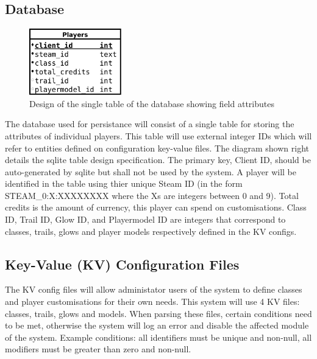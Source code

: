\documentclass[a4paper, 11pt]{article}
\begin{document}
\subsection{Database}
\begin{figure}
\center
\vspace{-20pt}
\includegraphics[width=4cm]{Design_Database.pdf}
\vspace{-10pt}
\caption{Design of the single table of the database showing field attributes}
\vspace{-10pt}
\end{figure}
The database used for persistance will consist of a single table for storing the attributes of individual players. This table will use external integer IDs which will refer to entities defined on configuration key-value files. The diagram shown right details the sqlite table design specification. The primary key, Client ID, should be auto-generated by sqlite but shall not be used by the system. A player will be identified in the table using thier unique Steam ID (in the form STEAM\_0:X:XXXXXXXX where the Xs are integers between 0 and 9). Total credits is the amount of currency, this player can spend on customisations. Class ID, Trail ID, Glow ID, and Playermodel ID are integers that correspond to classes, trails, glows and player models respectively defined in the KV configs.

\subsection{Key-Value (KV) Configuration Files}
The KV config files will allow administator users of the system to define classes and player customisations for their own needs. This system will use 4 KV files: classes, trails, glows and models. When parsing these files, certain conditions need to be met, otherwise the system will log an error and disable the affected module of the system. Example conditions: all identifiers must be unique and non-null, all modifiers must be greater than zero and non-null.
\end{document}
